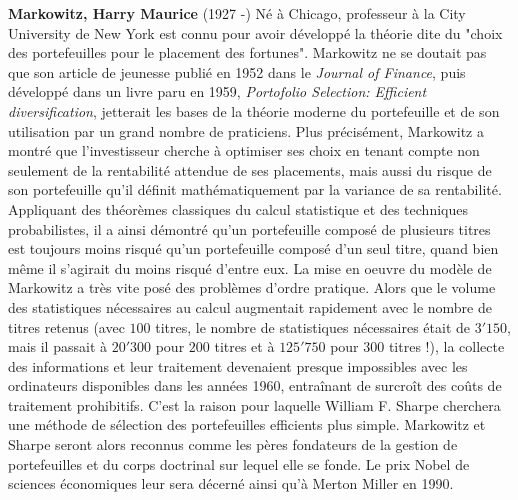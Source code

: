 \textbf{Markowitz, Harry Maurice} (1927 -) Né à Chicago, professeur à la City University de New York est connu pour avoir développé la théorie dite du "choix des portefeuilles pour le placement des fortunes". Markowitz ne se doutait pas que son article de jeunesse publié en 1952 dans le \textit{Journal of Finance}, puis développé dans un livre paru en 1959, \textit{Portofolio Selection: Efficient diversification}, jetterait les bases de la théorie moderne du portefeuille et de son utilisation par un grand nombre de praticiens. Plus précisément, Markowitz a montré que l'investisseur cherche à optimiser ses choix en tenant compte non seulement de la rentabilité attendue de ses placements, mais aussi du risque de son portefeuille qu'il définit mathématiquement par la variance de sa rentabilité. Appliquant des théorèmes classiques du calcul statistique et des techniques probabilistes, il a ainsi démontré qu'un portefeuille composé de plusieurs titres est toujours moins risqué qu'un portefeuille composé d'un seul titre, quand bien même il s'agirait du moins risqué d'entre eux. La mise en oeuvre du modèle de Markowitz a très vite posé des problèmes d'ordre pratique. Alors que le volume des statistiques nécessaires au calcul augmentait rapidement avec le nombre de titres retenus (avec $100$ titres, le nombre de statistiques nécessaires était de $3'150$, mais il passait à $20'300$ pour $200$ titres et à $125'750$ pour $300$ titres !), la collecte des informations et leur traitement devenaient presque impossibles avec les ordinateurs disponibles dans les années 1960, entraînant de surcroît des coûts de traitement prohibitifs. C'est la raison pour laquelle William F. Sharpe cherchera une méthode de sélection des portefeuilles efficients plus simple. Markowitz et Sharpe seront alors reconnus comme les pères fondateurs de la gestion de portefeuilles et du corps doctrinal sur lequel elle se fonde. Le prix Nobel de sciences économiques leur sera décerné ainsi qu'à Merton Miller en 1990.

